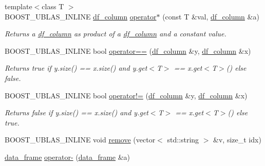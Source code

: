 \begin{DoxyCompactItemize}
{\footnotesize template$<$class T $>$ }\\B\+O\+O\+S\+T\+\_\+\+U\+B\+L\+A\+S\+\_\+\+I\+N\+L\+I\+NE \hyperlink{classboost_1_1numeric_1_1ublas_1_1df__column}{df\+\_\+column} \hyperlink{namespaceboost_1_1numeric_1_1ublas_aa753b89e21db8fbc3f3c50a5d61eb391}{operator$\ast$} (const T \&val, \hyperlink{classboost_1_1numeric_1_1ublas_1_1df__column}{df\+\_\+column} \&a)
\begin{DoxyCompactList}\small\item\em Returns a \hyperlink{classboost_1_1numeric_1_1ublas_1_1df__column}{df\+\_\+column} as product of a \hyperlink{classboost_1_1numeric_1_1ublas_1_1df__column}{df\+\_\+column} and a constant value. \end{DoxyCompactList}\item 
B\+O\+O\+S\+T\+\_\+\+U\+B\+L\+A\+S\+\_\+\+I\+N\+L\+I\+NE bool \hyperlink{namespaceboost_1_1numeric_1_1ublas_a3b1e71f695ecb6efb4599e4c11db7b33}{operator==} (\hyperlink{classboost_1_1numeric_1_1ublas_1_1df__column}{df\+\_\+column} \&y, \hyperlink{classboost_1_1numeric_1_1ublas_1_1df__column}{df\+\_\+column} \&x)
\begin{DoxyCompactList}\small\item\em Returns {\ttfamily true} if {\ttfamily y.\+size()} == {\ttfamily x.\+size()} and {\ttfamily y.\+get$<$\+T$>$} == {\ttfamily x.\+get$<$\+T$>$()} else {\ttfamily false}. \end{DoxyCompactList}\item 
B\+O\+O\+S\+T\+\_\+\+U\+B\+L\+A\+S\+\_\+\+I\+N\+L\+I\+NE bool \hyperlink{namespaceboost_1_1numeric_1_1ublas_acb2da4513828781cd99e831326b65d75}{operator!=} (\hyperlink{classboost_1_1numeric_1_1ublas_1_1df__column}{df\+\_\+column} \&y, \hyperlink{classboost_1_1numeric_1_1ublas_1_1df__column}{df\+\_\+column} \&x)
\begin{DoxyCompactList}\small\item\em Returns {\ttfamily false} if {\ttfamily y.\+size()} == {\ttfamily x.\+size()} and {\ttfamily y.\+get$<$\+T$>$} == {\ttfamily x.\+get$<$\+T$>$()} else {\ttfamily true}. \end{DoxyCompactList}\item 
B\+O\+O\+S\+T\+\_\+\+U\+B\+L\+A\+S\+\_\+\+I\+N\+L\+I\+NE void \hyperlink{namespaceboost_1_1numeric_1_1ublas_a71c332a163ff84135fc371c37e797b60}{remove} (vector$<$ std\+::string $>$ \&v, size\+\_\+t idx)
\item 
\hyperlink{classboost_1_1numeric_1_1ublas_1_1data__frame}{data\+\_\+frame} \hyperlink{namespaceboost_1_1numeric_1_1ublas_ae8ed8ec1868fc661bbe4e44eb5fda0d6}{operator-\/} (\hyperlink{classboost_1_1numeric_1_1ublas_1_1data__frame}{data\+\_\+frame} \&a)

\end{DoxyCompactItemize}
